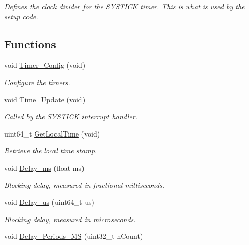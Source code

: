 \begin{DoxyCompactItemize}
\begin{DoxyCompactList}\small\item\em Defines the clock divider for the S\-Y\-S\-T\-I\-C\-K timer. This is what is used by the setup code. \end{DoxyCompactList}\end{DoxyCompactItemize}
\subsection*{Functions}
\begin{DoxyCompactItemize}
\item 
void \hyperlink{group__tekdaqc__timers_ga3c15420197589e14aa4da4b880a8005f}{Timer\-\_\-\-Config} (void)
\begin{DoxyCompactList}\small\item\em Configure the timers. \end{DoxyCompactList}\item 
void \hyperlink{group__tekdaqc__timers_ga194e6c4226839758664f0e68816c0713}{Time\-\_\-\-Update} (void)
\begin{DoxyCompactList}\small\item\em Called by the S\-Y\-S\-T\-I\-C\-K interrupt handler. \end{DoxyCompactList}\item 
uint64\-\_\-t \hyperlink{group__tekdaqc__timers_ga11a66b1728633b77403a588f66a1be95}{Get\-Local\-Time} (void)
\begin{DoxyCompactList}\small\item\em Retrieve the local time stamp. \end{DoxyCompactList}\item 
void \hyperlink{group__tekdaqc__timers_gaf7d18dc0155f873c4ed1d149e6060d19}{Delay\-\_\-ms} (float ms)
\begin{DoxyCompactList}\small\item\em Blocking delay, measured in fractional milliseconds. \end{DoxyCompactList}\item 
void \hyperlink{group__tekdaqc__timers_ga5ec7c1ff1d0645d24d030f36382e9417}{Delay\-\_\-us} (uint64\-\_\-t us)
\begin{DoxyCompactList}\small\item\em Blocking delay, measured in microseconds. \end{DoxyCompactList}\item 
void \hyperlink{group__tekdaqc__timers_gaa826dcc6214549a3ae300594de880024}{Delay\-\_\-\-Periods\-\_\-M\-S} (uint32\-\_\-t n\-Count)

\end{DoxyCompactItemize}
